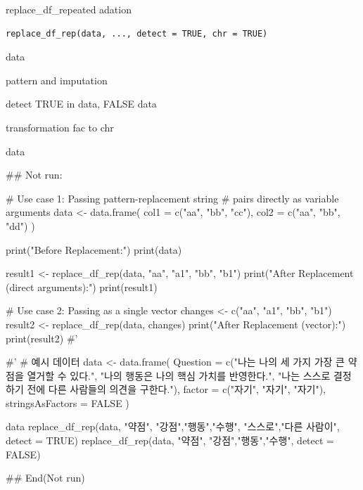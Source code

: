 \documentclass[a4paper]{book}
\begin{document}
%
\begin{Description}
replace\_df\_repeated adation
\end{Description}
%
\begin{Usage}
\begin{verbatim}
replace_df_rep(data, ..., detect = TRUE, chr = TRUE)
\end{verbatim}
\end{Usage}
%
\begin{Arguments}
\begin{ldescription}
\item[\code{data}] data

\item[\code{...}] pattern and imputation

\item[\code{detect}] detect TRUE in data, FALSE data

\item[\code{chr}] transformation fac  to chr
\end{ldescription}
\end{Arguments}
%
\begin{Value}
data
\end{Value}
%
\begin{Examples}
\begin{ExampleCode}

\#\# Not run: 

# Use case 1: Passing pattern-replacement string
# pairs directly as variable arguments
data <- data.frame(
  col1 = c("aa", "bb", "cc"),
  col2 = c("aa", "bb", "dd")
)

print("Before Replacement:")
print(data)

result1 <- replace_df_rep(data, "aa", "a1", "bb", "b1")
print("After Replacement (direct arguments):")
print(result1)

# Use case 2: Passing as a single vector
changes <- c("aa", "a1", "bb", "b1")
result2 <- replace_df_rep(data, changes)
print("After Replacement (vector):")
print(result2)
#'

#'
# 예시 데이터
data <- data.frame(
  Question = c("나는 나의 세 가지 가장 큰 약점을 열거할 수 있다.",
   "나의 행동은 나의 핵심 가치를 반영한다.",
   "나는 스스로 결정하기 전에 다른 사람들의 의견을 구한다."),
  factor = c("자기", "자기", "자기"),
  stringsAsFactors = FALSE
)

data
replace_df_rep(data, "약점", "강점","행동","수행",
"스스로","다른 사람이",  detect = TRUE)
replace_df_rep(data, "약점",
"강점","행동","수행",  detect = FALSE)



## End(Not run)



\end{ExampleCode}
\end{Examples}
\end{document}
